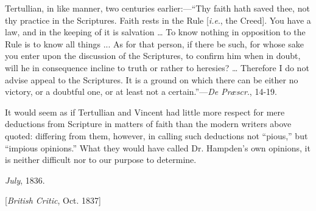 Tertullian, in like manner, two centuries
earlier:—``Thy faith hath saved thee, not thy practice in the
Scriptures. Faith rests in the Rule [\emph{i.e}., the Creed]. You have
a law, and in the keeping of it is salvation … To know nothing in
opposition to the Rule is to know all things ... As for that person,
if there be such, for whose sake you enter upon the discussion of
the Scriptures, to confirm him when in doubt, will he in
consequence incline to truth or rather to heresies? … Therefore I do
not advise appeal to the Scriptures. It is a ground on which there can
be either no victory, or a doubtful one, or at least not a certain.''—\emph{De
Præscr}., 14-19.

It would seem as if Tertullian and Vincent had
little more respect for mere deductions from Scripture in matters of
faith than the modern writers above quoted: differing from them,
however, in calling such deductions not ``pious,'' but ``impious
opinions.'' What they would have called Dr. Hampden's own opinions, it
is neither difficult nor to our purpose to determine.

\emph{July}, 1836.


[\emph{British Critic}, Oct. 1837]

